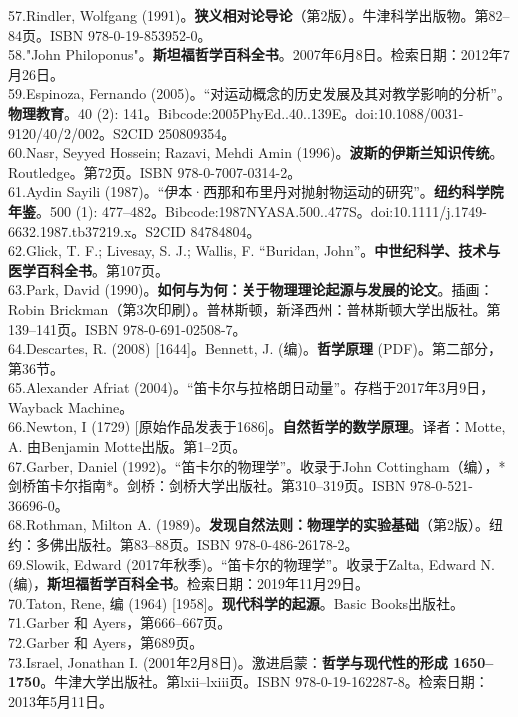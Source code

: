 57.Rindler, Wolfgang (1991)。\textbf{狭义相对论导论}（第2版）。牛津科学出版物。第82–84页。ISBN 978-0-19-853952-0。\\
58."John Philoponus"。\textbf{斯坦福哲学百科全书}。2007年6月8日。检索日期：2012年7月26日。\\
59.Espinoza, Fernando (2005)。“对运动概念的历史发展及其对教学影响的分析”。\textbf{物理教育}。40 (2): 141。Bibcode:2005PhyEd..40..139E。doi:10.1088/0031-9120/40/2/002。S2CID 250809354。\\
60.Nasr, Seyyed Hossein; Razavi, Mehdi Amin (1996)。\textbf{波斯的伊斯兰知识传统}。Routledge。第72页。ISBN 978-0-7007-0314-2。\\
61.Aydin Sayili (1987)。“伊本·西那和布里丹对抛射物运动的研究”。\textbf{纽约科学院年鉴}。500 (1): 477–482。Bibcode:1987NYASA.500..477S。doi:10.1111/j.1749-6632.1987.tb37219.x。S2CID 84784804。\\
62.Glick, T. F.; Livesay, S. J.; Wallis, F. “Buridan, John”。\textbf{中世纪科学、技术与医学百科全书}。第107页。\\
63.Park, David (1990)。\textbf{如何与为何：关于物理理论起源与发展的论文}。插画：Robin Brickman（第3次印刷）。普林斯顿，新泽西州：普林斯顿大学出版社。第139–141页。ISBN 978-0-691-02508-7。\\
64.Descartes, R. (2008) [1644]。Bennett, J. (编)。\textbf{哲学原理} (PDF)。第二部分，第36节。\\
65.Alexander Afriat (2004)。“笛卡尔与拉格朗日动量”。存档于2017年3月9日，Wayback Machine。\\
66.Newton, I (1729) [原始作品发表于1686]。\textbf{自然哲学的数学原理}。译者：Motte, A. 由Benjamin Motte出版。第1–2页。\\
67.Garber, Daniel (1992)。“笛卡尔的物理学”。收录于John Cottingham（编），*剑桥笛卡尔指南*。剑桥：剑桥大学出版社。第310–319页。ISBN 978-0-521-36696-0。\\
68.Rothman, Milton A. (1989)。\textbf{发现自然法则：物理学的实验基础}（第2版）。纽约：多佛出版社。第83–88页。ISBN 978-0-486-26178-2。\\
69.Slowik, Edward (2017年秋季)。“笛卡尔的物理学”。收录于Zalta, Edward N. (编)，\textbf{斯坦福哲学百科全书}。检索日期：2019年11月29日。\\
70.Taton, Rene, 编 (1964) [1958]。\textbf{现代科学的起源}。Basic Books出版社。\\
71.Garber 和 Ayers，第666–667页。\\
72.Garber 和 Ayers，第689页。\\
73.Israel, Jonathan I. (2001年2月8日)。激进启蒙：\textbf{哲学与现代性的形成 1650–1750}。牛津大学出版社。第lxii–lxiii页。ISBN 978-0-19-162287-8。检索日期：2013年5月11日。\\
